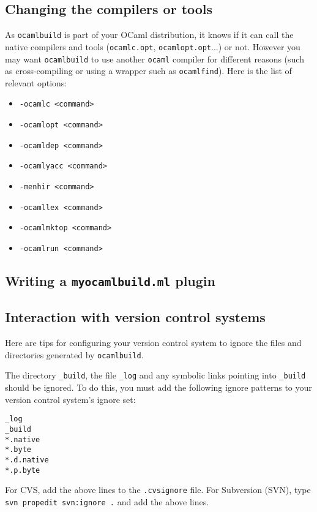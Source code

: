 \documentclass[9pt]{article}
\newcommand{\ocb}{\texttt{ocamlbuild}\xspace}
\begin{document}
\subsection{Changing the compilers or tools}
As \ocb is part of your OCaml distribution, it knows if it can call the
native compilers and tools (\texttt{ocamlc.opt}, \texttt{ocamlopt.opt}...)
or not.  However you may want \ocb to use another \texttt{ocaml} compiler
for different reasons (such as cross-compiling or using a wrapper such as
\texttt{ocamlfind}).  Here is the list of relevant options:
\begin{itemize}
  \item \texttt{-ocamlc <command>}
  \item \texttt{-ocamlopt <command>}
  \item \texttt{-ocamldep <command>}
  \item \texttt{-ocamlyacc <command>}
  \item \texttt{-menhir <command>}
  \item \texttt{-ocamllex <command>}
  \item \texttt{-ocamlmktop <command>}
  \item \texttt{-ocamlrun <command>}
\end{itemize}

\subsection{Writing a \texttt{myocamlbuild.ml} plugin}
\subsection{Interaction with version control systems}
Here are tips for configuring your version control system to ignore the files
and directories generated by \ocb.

The directory \texttt{\_build}, the file \texttt{\_log} and any symbolic links
pointing into \texttt{\_build} should be ignored.
To do this, you must add the following ignore patterns to your version
control system's ignore set:
\begin{verbatim}
_log
_build
*.native
*.byte
*.d.native
*.p.byte
\end{verbatim}

For CVS, add the above lines to the \texttt{.cvsignore} file.
For Subversion (SVN), type \texttt{svn propedit svn:ignore .} and add the
above lines.
\end{document}

